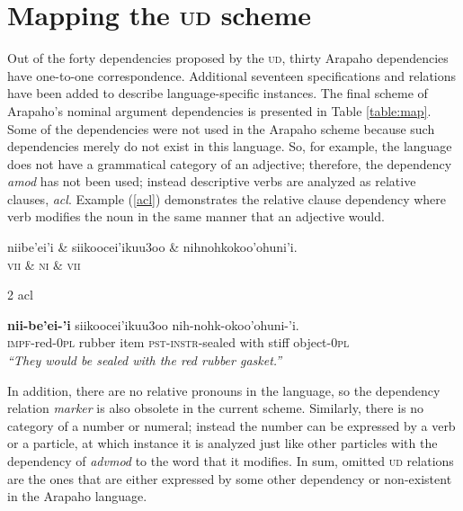 \documentclass[11pt]{article}
\begin{document}
\section{Mapping the \textsc{ud} scheme} \label{map}
Out of the forty dependencies proposed by the \textsc{ud}, thirty Arapaho dependencies have one-to-one correspondence. Additional seventeen specifications and relations have been added to describe language-specific instances. The final scheme of Arapaho's nominal argument dependencies is presented in Table \ref{table:map}. Some of the dependencies were not used in the Arapaho scheme because such dependencies merely do not exist in this language. So, for example, the language does not have a grammatical category of an adjective; therefore, the dependency \textit{amod} has not been used; instead descriptive verbs are analyzed as relative clauses, \textit{acl}.  Example (\ref{acl}) demonstrates the relative clause dependency where verb modifies the noun in the same manner that an adjective would.

\small
\begin{exe}
\ex \label{acl}%
\begin{adjustwidth*}{-0.1in}{-0.1in}
\begin{dependency}
\begin{deptext}
niibe'ei'i \& siikoocei'ikuu3oo \& nihnohkokoo'ohuni'i.\\
\textsc{vii} \& \textsc{ni} \& \textsc{vii}\\
\end{deptext}
	{2}	{acl}
\end{dependency}
\gll \textbf{nii-be'ei-'i} siikoocei'ikuu3oo nih-nohk-okoo'ohuni-'i.\\
{\textsc{impf}-red-\textsc{0pl}} {rubber item} {\textsc{pst-instr}-sealed with stiff object-\textsc{0pl}}\\
\trans \textit{``They would be sealed with the red rubber gasket.''}
\end{adjustwidth*}
\end{exe}
\normalsize
In addition, there are no relative pronouns in the language, so the dependency relation \textit{marker} is also obsolete in the current scheme. Similarly, there is no category of a number or numeral; instead the number can be expressed by a verb or a particle, at which instance it is analyzed just like other particles with the dependency of \textit{advmod} to the word that it modifies. In sum, omitted \textsc{ud} relations are the ones that are either expressed by some other dependency or non-existent in the Arapaho language. 
\end{document}
